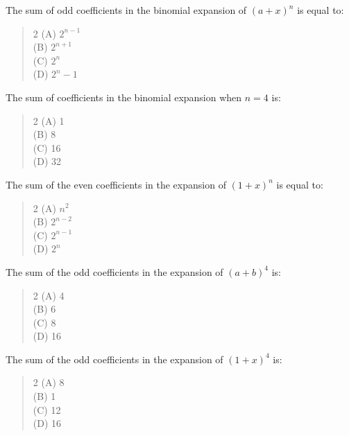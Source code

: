 \documentclass[11pt,a4paper]{article}
\begin{document}
\begin{mcqlist}
\item The sum of odd coefficients in the binomial expansion of $(a+x)^n$ is equal to:
\begin{quote}\begin{multicols}{2}
\noindent (A) $2^{n-1}$ \\
(B) $2^{n+1}$ \\
(C) $2^n$ \\
(D) $2^n-1$
\end{multicols}\end{quote}

\item The sum of coefficients in the binomial expansion when $n=4$ is:
\begin{quote}\begin{multicols}{2}
\noindent (A) 1 \\
(B) 8 \\
(C) 16 \\
(D) 32
\end{multicols}\end{quote}

\item The sum of the even coefficients in the expansion of $(1+x)^n$ is equal to:
\begin{quote}\begin{multicols}{2}
\noindent (A) $n^2$ \\
(B) $2^{n-2}$ \\
(C) $2^{n-1}$ \\
(D) $2^n$
\end{multicols}\end{quote}

\item The sum of the odd coefficients in the expansion of $(a+b)^4$ is:
\begin{quote}\begin{multicols}{2}
\noindent (A) 4 \\
(B) 6 \\
(C) 8 \\
(D) 16
\end{multicols}\end{quote}

\item The sum of the odd coefficients in the expansion of $(1+x)^4$ is:
\begin{quote}\begin{multicols}{2}
\noindent (A) 8 \\
(B) 1 \\
(C) 12 \\
(D) 16
\end{multicols}\end{quote}


\end{mcqlist}
\end{document}
